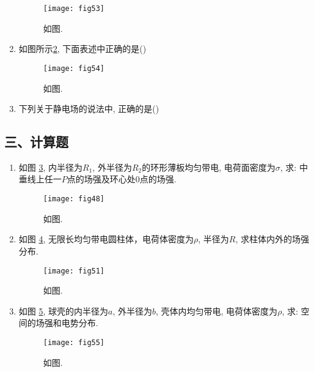 \begin{enumerate}
\begin{figure}[H]
        \centering
        \texttt{[image: fig53]}
        \caption{如图.}\label{fig:53}
    \end{figure}
    \item 如图所示\ref{fig:54}, 下面表述中正确的是(\hspace{1pc})
    \begin{figure}[H]
        \centering
        \texttt{[image: fig54]}
        \caption{如图.}\label{fig:54}
    \end{figure}
    \item 下列关于静电场的说法中, 正确的是(\hspace{1pc})
\end{enumerate}
\subsection*{三、计算题}
\begin{enumerate}
    \item 如图 \ref{fig:48}, 内半径为$R_1$, 外半径为$R_2$的环形薄板均匀带电, 电荷面密度为$\sigma$, 求: 中垂线上任一$P$点的场强及环心处0点的场强.
    \begin{figure}[H]
        \centering
        \texttt{[image: fig48]}
        \caption{如图.}\label{fig:48}
    \end{figure}
    \item 如图 \ref{fig:51}, 无限长均匀带电圆柱体，电荷体密度为$\rho$, 半径为$R$, 求柱体内外的场强分布.
    \begin{figure}[H]
        \centering
        \texttt{[image: fig51]}
        \caption{如图.}\label{fig:51}
    \end{figure}

    \item 如图 \ref{fig:55}, 球壳的内半径为$a$, 外半径为$b$, 壳体内均匀带电, 电荷体密度为$\rho$, 求: 空间的场强和电势分布.
    \begin{figure}[H]
        \centering
        \texttt{[image: fig55]}
        \caption{如图.}\label{fig:55}
    \end{figure}
\end{enumerate}